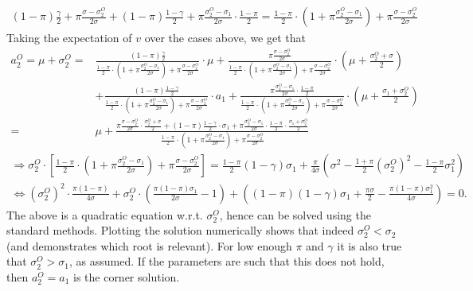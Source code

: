 \documentclass[a4paper]{article}
\begin{document}
\begin{enumerate}
	\begin{multline*}
		(1-\pi) \frac{\gamma}{2} + \pi \frac{\sigma - \sigma_2^O}{2\sigma} + (1-\pi)\frac{1-\gamma}{2} + \pi \frac{\sigma_2^O - \sigma_1}{2\sigma} \cdot \frac{1-\pi}{2}
		= \frac{1-\pi}{2} \cdot \left( 1 + \pi \frac{\sigma_2^O - \sigma_1}{2\sigma} \right) + \pi \frac{\sigma - \sigma_2^O}{2\sigma}
	\end{multline*}
	Taking the expectation of $v$ over the cases above, we get that
	\begin{align*}
		a_2^O = \mu + \sigma_2^O
		=& \frac{(1-\pi)\frac{\gamma}{2} }{ \frac{1-\pi}{2} \cdot \left( 1 + \pi \frac{\sigma_2^O - \sigma_1}{2\sigma} \right) + \pi \frac{\sigma - \sigma_2^O}{2\sigma} } \cdot \mu 
		+ \frac{\pi \frac{\sigma - \sigma_2^O}{2\sigma} }{ \frac{1-\pi}{2} \cdot \left( 1 + \pi \frac{\sigma_2^O - \sigma_1}{2\sigma} \right) + \pi \frac{\sigma - \sigma_2^O}{2\sigma} } \cdot \left(\mu + \frac{\sigma_2^O + \sigma}{2}\right)
		\\
		&+ \frac{(1-\pi)\frac{1-\gamma}{2} }{ \frac{1-\pi}{2} \cdot \left( 1 + \pi \frac{\sigma_2^O - \sigma_1}{2\sigma} \right) + \pi \frac{\sigma - \sigma_2^O}{2\sigma} } \cdot a_1
		+ \frac{\pi \frac{\sigma_2^O - \sigma_1}{2\sigma} \cdot \frac{1-\pi}{2} }{ \frac{1-\pi}{2} \cdot \left( 1 + \pi \frac{\sigma_2^O - \sigma_1}{2\sigma} \right) + \pi \frac{\sigma - \sigma_2^O}{2\sigma} } \cdot \left( \mu + \frac{\sigma_1 + \sigma_2^O}{2} \right) 
		\\
		=& \mu + \frac{ \pi \frac{\sigma - \sigma_2^O}{2\sigma} \cdot \frac{\sigma_2^O + \sigma}{2} + (1-\pi)\frac{1-\gamma}{2} \cdot \sigma_1 + \pi \frac{\sigma_2^O - \sigma_1}{2\sigma} \cdot \frac{1-\pi}{2} \cdot \frac{\sigma_1 + \sigma_2^O}{2} 
			}{ 
		\frac{1-\pi}{2} \cdot \left( 1 + \pi \frac{\sigma_2^O - \sigma_1}{2\sigma} \right) + \pi \frac{\sigma - \sigma_2^O}{2\sigma} }
	\end{align*}
	\begin{align*}
		\Rightarrow 
		\sigma_2^O \cdot \left[ \frac{1-\pi}{2} \cdot \left( 1 + \pi \frac{\sigma_2^O - \sigma_1}{2\sigma} \right) + \pi \frac{\sigma - \sigma_2^O}{2\sigma} \right]
		= \frac{1-\pi}{2} (1-\gamma) \sigma_1 + \frac{\pi}{4\sigma} \left( \sigma^2 - \frac{1+\pi}{2} (\sigma_2^O)^2 - \frac{1-\pi}{2} \sigma_1^2 \right)
		\\ \iff 
		(\sigma_2^O)^2 \cdot \frac{\pi(1-\pi)}{4\sigma} + \sigma_2^O \cdot \left( \frac{\pi(1-\pi) \sigma_1}{2\sigma} - 1 \right) + \left( (1-\pi)(1-\gamma) \sigma_1 + \frac{\pi \sigma}{2} - \frac{\pi(1-\pi)\sigma_1^2}{4\sigma} \right) = 0.
	\end{align*}
	The above is a quadratic equation w.r.t. $\sigma_2^O$, hence can be solved using the standard methods. Plotting the solution numerically shows that indeed $\sigma_2^O < \sigma_2$ (and demonstrates which root is relevant). For low enough $\pi$ and $\gamma$ it is also true that $\sigma_2^O > \sigma_1$, as assumed. If the parameters are such that this does not hold, then $a_2^O = a_1$ is the corner solution.
\end{enumerate}
\fi
\end{document}
